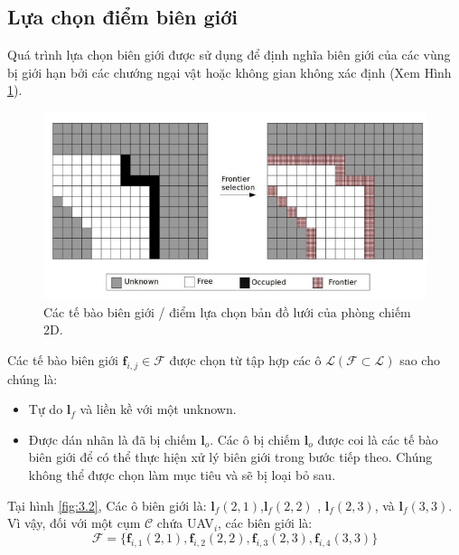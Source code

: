 \documentclass[11pt,openany]{book}
\begin{document}
\subsection{Lựa chọn điểm biên giới}
Quá trình lựa chọn biên giới được sử dụng để định nghĩa biên giới của các vùng bị giới hạn bởi các chướng ngại vật hoặc không gian không xác định (Xem Hình \ref{fig:3.3}).
\begin{figure}[H]
    \centering
    \includegraphics[scale=0.4]{assets/3_3.png}
    \caption{Các tế bào biên giới / điểm lựa chọn bản đồ lưới của phòng chiếm 2D.}
    \label{fig:3.3}
\end{figure}
Các tế bào biên giới $\mathbf{f}_{i,j} \in \mathcal{F}$ được chọn từ tập hợp các ô $\mathcal{L}(\mathcal{F}\subset \mathcal{L})$ sao cho chúng là:
\begin{itemize}
    \item Tự do $\mathbf{l}_f$ và liền kề với một unknown.
    \item Được dán nhãn là đã bị chiếm $\mathbf{l}_o$. Các ô bị chiếm $\mathbf{l}_o$ được coi là các tế bào biên giới để có thể thực hiện xử lý biên giới trong bước tiếp theo. Chúng không thể được chọn làm mục tiêu và sẽ bị loại bỏ sau.
\end{itemize}
Tại hình \ref{fig:3.2}, Các ô biên giới là: $\mathbf{l}_f(2,1)$,$\mathbf{l}_f(2,2)$ , $\mathbf{l}_f(2,3)$, và $\mathbf{l}_f(3,3)$. Vì vậy, đối với một cụm $\mathcal{C}$ chứa UAV$_i$, các biên giới là:
\begin{equation} \label{eq:3.1}
    \mathcal{F}=\{\mathbf{f}_{i,1}(2,1),\mathbf{f}_{i,2}(2,2),\mathbf{f}_{i,3}(2,3),\mathbf{f}_{i,4}(3,3)\}
\end{equation}
\end{document}
